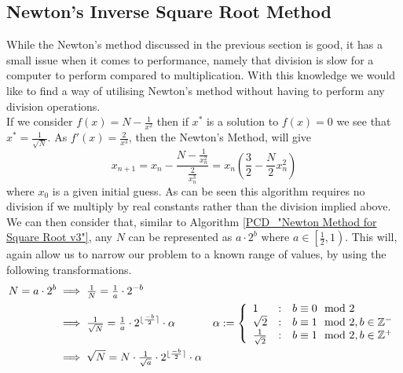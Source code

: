 \subsection{Newton's Inverse Square Root Method}
\label{SUB_"Newton's Inverse Square Root Method"}

\theoremstyle{plain}
\newtheorem{Inv Sqrt Quad Conv}{Proposition}[subsection]

While the Newton's method discussed in the previous section is good, it has a small issue when it comes to performance, namely that division is slow for a computer to perform compared to multiplication. With this knowledge we would like to find a way of utilising Newton's method without having to perform any division operations.\\

If we consider \(f(x) = N - \frac{1}{x^2}\) then if \(x^\ast\) is a solution to \(f(x) = 0\) we see that \(x^\ast = \frac{1}{\sqrt{N}}\). As \(f'(x) = \frac{2}{x^3}\), then the Newton's Method, will give \[x_{n+1} = x_n - \frac{N - \frac{1}{x_n^2}}{\frac{2}{x_n^3}} = x_n\left(\frac{3}{2} - \frac{N}{2}x_n^2\right)\] where \(x_0\) is a given initial guess. As can be seen this algorithm requires no division if we multiply by real constants rather than the division implied above.\\

We can then consider that, similar to Algorithm \ref{PCD_"Newton Method for Square Root v3"}, any \(N\) can be represented as \(a \cdot 2^b\) where \(a \in \left[\tfrac{1}{2}, 1\right)\). This will, again allow us to narrow our problem to a known range of values, by using the following transformations.
\begin{displaymath}
\begin{align*}
N = a \cdot 2^b &\implies \tfrac{1}{N} = \tfrac{1}{a} \cdot 2^{-b}\\
	&\implies \tfrac{1}{\sqrt{N}} = \tfrac{1}{a}\cdot2^{\lfloor\frac{-b}{2}\rceil} \cdot \alpha
		&\alpha := \left\{
			\begin{array}{lcl}
				1 & : & b \equiv 0 \mod 2\\
				\sqrt{2} & : & b \equiv 1 \mod 2, b \in \mathbb{Z}^-\\
				\frac{1}{\sqrt{2}} & : & b \equiv 1 \mod 2, b \in \mathbb{Z}^+\\
			\end{array}\right.\\
	& \implies \sqrt{N} = N \cdot \tfrac{1}{\sqrt{a}} \cdot 2^{\lfloor\frac{-b}{2}\rceil} \cdot \alpha
\end{align*}
\end{displaymath}

